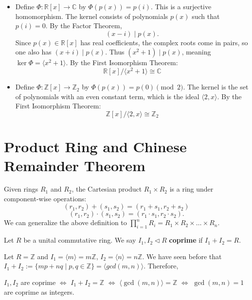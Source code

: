 \begin{example}
\begin{itemize}
    \item Define $\Phi: \mathbb{R}[x] \to \mathbb{C}$ by $\Phi(p(x)) = p(i)$. This is a surjective homomorphism. The kernel consists of polynomials $p(x)$ such that $p(i) = 0$. By the Factor Theorem, 
    $$(x-i) \mid p(x).$$ 
    Since $p(x) \in \mathbb{R}[x]$ has real coefficients, the complex roots come in pairs, so one also has $(x+i) \mid p(x)$. Thus $(x^2+1) \mid p(x)$, meaning $\ker \Phi = \langle x^2+1 \rangle$. By the First Isomorphism Theorem:
    \[ \mathbb{R}[x]/\langle x^2 + 1 \rangle \cong \mathbb{C} \]
    
    \item Define $\Phi: \mathbb{Z}[x] \to \mathbb{Z}_2$ by $\Phi(p(x)) = p(0) \pmod 2$. The kernel is the set of polynomials with an even constant term, which is the ideal $\langle 2, x \rangle$. By the First Isomorphism Theorem:
    \[ \mathbb{Z}[x]/\langle 2, x \rangle \cong \mathbb{Z}_2 \]
\end{itemize}
\end{example}

\section{Product Ring and Chinese Remainder Theorem}
\begin{definition}
Given rings $R_1$ and $R_2$, the Cartesian product $R_1 \times R_2$ is a ring under component-wise operations:
\[ (r_1, r_2) + (s_1, s_2) = (r_1 + s_1, r_2 + s_2) \]
\[ (r_1, r_2) \cdot (s_1, s_2) = (r_1 \cdot s_1, r_2 \cdot s_2). \]
We can generalize the above definition to $\prod_{i=1}^n R_i = R_1 \times R_2 \times \dots \times R_n.$
\end{definition}


\begin{definition}
Let $R$ be a unital commutative ring. We say $I_1,I_2\triangleleft R$ \textbf{coprime} if $I_1+I_2=R$.
\end{definition}

\begin{example}
Let $R=\mathbb{Z}$ and $I_1=\langle m\rangle=m\mathbb{Z}$, $I_2=\langle n\rangle=n\mathbb{Z}$. We have seen before that $I_1+I_2:=\{mp+nq\mid p,q\in\mathbb{Z}\}=\langle gcd(m,n)\rangle$. Therefore, 
\begin{center}
$I_1 , I_2$ are coprime $\Leftrightarrow$ $I_1+I_2=\mathbb{Z}$ $\Leftrightarrow$ $\langle \gcd(m,n)\rangle=\mathbb{Z}$ $\Leftrightarrow$ $\gcd(m,n)=1$ are coprime as integers.
\end{center}
\end{example}

